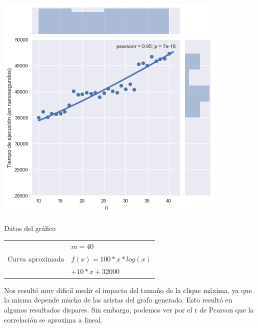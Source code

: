 \noindent
\begin{minipage}{0.55\textwidth}
    \hfill
    \includegraphics[scale=0.6]{img/greedy-n.png}
\end{minipage}
\hfill
\begin{minipage}{0.44\textwidth}
    \begin{center}
        Datos del gráfico

        \begin{tabular}{ | l l |}
            \hline
             & $m = 40$ \\ 
            Curva aproximada & $f(x) = 100 * x * log(x)$\\
             & $+ 10 * x + 32000$ \\
            \hline
        \end{tabular}
    \end{center}
\end{minipage}

Nos resultó muy dificil medir el impacto del tamaño de la clique máxima, ya que la misma depende mucho de las aristas del grafo generado. Esto resultó en algunos resultados dispares. Sin embargo, podemos ver por el r de Pearson que la correlación se aproxima a lineal.

